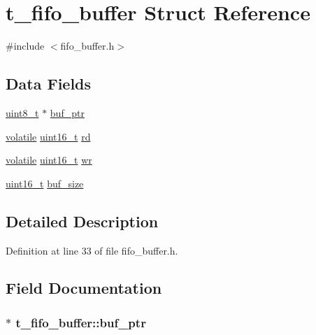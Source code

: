 \hypertarget{structt__fifo__buffer}{\section{t\-\_\-fifo\-\_\-buffer Struct Reference}
\label{structt__fifo__buffer}
}


{\ttfamily \#include $<$fifo\-\_\-buffer.\-h$>$}

\subsection*{Data Fields}
\begin{DoxyCompactItemize}
\item 
\hyperlink{stdint_8h_aba7bc1797add20fe3efdf37ced1182c5}{uint8\-\_\-t} $\ast$ \hyperlink{structt__fifo__buffer_af8dc86ee1c0f0d5c3e44585cdc876da7}{buf\-\_\-ptr}
\item 
\hyperlink{group___c_m_s_i_s___core___instruction_interface_gad7d93af13046b0378601b85c8c16673b}{volatile} \hyperlink{stdint_8h_a273cf69d639a59973b6019625df33e30}{uint16\-\_\-t} \hyperlink{structt__fifo__buffer_af64a7e9ffdbe3eea93ad06b891189179}{rd}
\item 
\hyperlink{group___c_m_s_i_s___core___instruction_interface_gad7d93af13046b0378601b85c8c16673b}{volatile} \hyperlink{stdint_8h_a273cf69d639a59973b6019625df33e30}{uint16\-\_\-t} \hyperlink{structt__fifo__buffer_a499ed012a0f43ac65deb1bbbe28689fd}{wr}
\item 
\hyperlink{stdint_8h_a273cf69d639a59973b6019625df33e30}{uint16\-\_\-t} \hyperlink{structt__fifo__buffer_a2ffa256dbcc216fcf1300aff50d41c3e}{buf\-\_\-size}
\end{DoxyCompactItemize}


\subsection{Detailed Description}


Definition at line 33 of file fifo\-\_\-buffer.\-h.



\subsection{Field Documentation}
\hypertarget{structt__fifo__buffer_af8dc86ee1c0f0d5c3e44585cdc876da7}{
\subsubsection[{buf\-\_\-ptr}]{$\ast$ t\-\_\-fifo\-\_\-buffer\-::buf\-\_\-ptr}}\label{structt__fifo__buffer_af8dc86ee1c0f0d5c3e44585cdc876da7}



